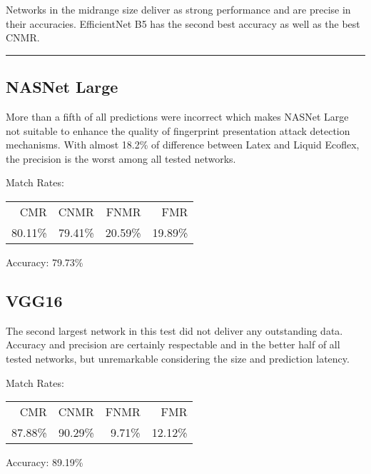 \bigskip\noindent
Networks in the midrange size deliver as strong performance and are precise in their accuracies.
EﬀicientNet B5 has the second best accuracy as well as the best CNMR.

\bigskip\hrule\bigskip


\subsection{NASNet Large}

\begin{minipage}[c]{0.7\textwidth}
    More than a fifth of all predictions were incorrect which makes NASNet Large not suitable to enhance the quality of fingerprint presentation attack detection mechanisms.
    With almost 18.2\% of difference between Latex and Liquid Ecoflex, the precision is the worst among all tested networks.

    \medskip\noindent\centering Match Rates: 
    \begin{tabular}{ r  r  r  r |}
        CMR       & CNMR      & FNMR     & FMR     \\
        80.11\%   & 79.41\%   & 20.59\%  & 19.89\%  \\
    \end{tabular} \hspace{2mm} Accuracy: 79.73\%
\end{minipage}
\hfill
\begin{minipage}[t]{0.3\textwidth}
    \centering
    
\end{minipage}


\bigskip
\subsection{VGG16}
\begin{minipage}[c]{0.7\textwidth}
    The second largest network in this test did not deliver any outstanding data.
    Accuracy and precision are certainly respectable and in the better half of all tested networks, but unremarkable considering the size and prediction latency.

    \medskip\noindent\centering Match Rates: 
    \begin{tabular}{ r  r  r  r |}
        CMR       & CNMR      & FNMR     & FMR     \\
        87.88\%   & 90.29\%   & 9.71\%   & 12.12\%  \\
    \end{tabular} \hspace{2mm} Accuracy: 89.19\%
\end{minipage}
\hfill
\begin{minipage}[c]{0.3\textwidth}
    \centering
    
\end{minipage}



